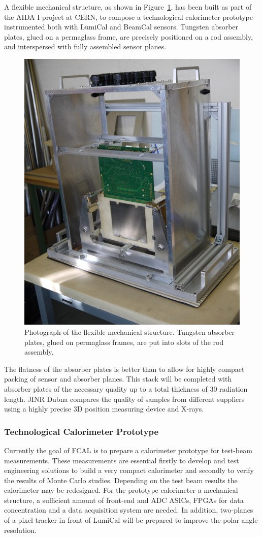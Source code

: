 A flexible mechanical structure, as shown in  Figure~\ref{fig:mechanical_structure}, has been built as part of the AIDA I project at CERN,
to compose a technological
calorimeter prototype instrumented both with LumiCal and BeamCal sensors.
Tungsten absorber plates, glued on a permaglass
frame, are precisely
positioned on a rod assembly, and interspersed with fully assembled sensor planes.
\begin{figure}[hbp]
\centering
\includegraphics[width=0.6\columnwidth,]{Calorimeter/FCAL/figs/mechanical_structure_2}
\caption{Photograph of the flexible mechanical structure. Tungsten absorber plates, glued on permaglass frames, are put into slots of the
rod assembly.}
\label{fig:mechanical_structure}
\end{figure}
The flatness of the absorber plates is better than \unit[50]{\micron} to allow for highly compact packing of sensor and absorber planes. This stack will be completed
with absorber plates of the necessary quality up to a total thickness of 30 radiation length. JINR Dubna compares the quality
of samples from
different suppliers using a highly precise 3D position measuring device and X-rays.

\subsubsection{Technological Calorimeter Prototype}

Currently the goal of FCAL is to prepare a calorimeter prototype for test-beam measurements. These measurements
are essential firstly to develop and test engineering solutions to build a very compact calorimeter and
secondly to verify the results of Monte Carlo studies. Depending on the test beam
results the calorimeter may be redesigned.
For the prototype calorimeter
a mechanical structure, a sufficient amount of front-end and ADC ASICs, FPGAs for
data concentration and
a data acquisition system are needed. In addition,
two-planes of a pixel tracker in front of LumiCal will be prepared to improve the polar angle resolution.



